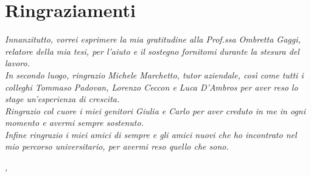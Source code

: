 
\cleardoublepage
{}
{}



\bigskip

\begingroup
\let\clearpage\relax
\let\cleardoublepage\relax
\let\cleardoublepage\relax

\chapter*{Ringraziamenti}

\noindent \textit{Innanzitutto, vorrei esprimere la mia gratitudine alla Prof.ssa Ombretta Gaggi, relatore della mia tesi, per l'aiuto e il sostegno fornitomi durante la stesura del lavoro.}\\

\noindent \textit{In secondo luogo, ringrazio Michele Marchetto, tutor aziendale, così come tutti i colleghi Tommaso Padovan, Lorenzo Ceccon e Luca D'Ambros per aver reso lo stage un'esperienza di crescita.}\\

\noindent \textit{Ringrazio col cuore i miei genitori Giulia e Carlo per aver creduto in me in ogni momento e avermi sempre sostenuto.}\\

\noindent \textit{Infine ringrazio i miei amici di sempre e gli amici nuovi che ho incontrato nel mio percorso universitario, per avermi reso quello che sono.}\\
\bigskip

\noindent\textit{\myLocation, \myTime}
\hfill \myName

\endgroup

